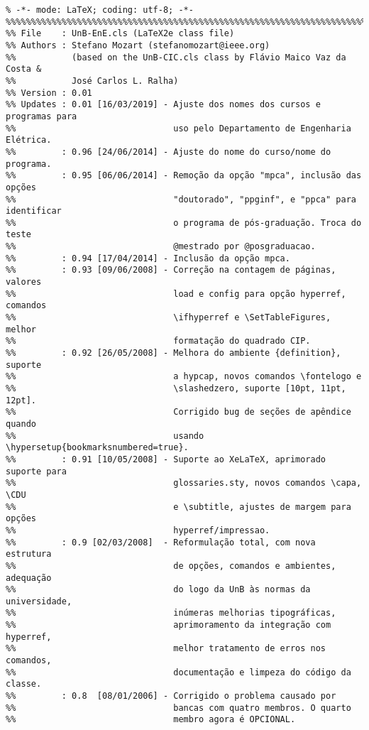 \small\begin{verbatim}
% -*- mode: LaTeX; coding: utf-8; -*-
%%%%%%%%%%%%%%%%%%%%%%%%%%%%%%%%%%%%%%%%%%%%%%%%%%%%%%%%%%%%%%%%%%%%%%%%%%%%%%%
%% File    : UnB-EnE.cls (LaTeX2e class file)
%% Authors : Stefano Mozart (stefanomozart@ieee.org)
%%           (based on the UnB-CIC.cls class by Flávio Maico Vaz da Costa &
%%           José Carlos L. Ralha)
%% Version : 0.01
%% Updates : 0.01 [16/03/2019] - Ajuste dos nomes dos cursos e programas para 
%%                               uso pelo Departamento de Engenharia Elétrica.
%%         : 0.96 [24/06/2014] - Ajuste do nome do curso/nome do programa.
%%         : 0.95 [06/06/2014] - Remoção da opção "mpca", inclusão das opções
%%                               "doutorado", "ppginf", e "ppca" para identificar
%%                               o programa de pós-graduação. Troca do teste 
%%                               @mestrado por @posgraduacao.
%%         : 0.94 [17/04/2014] - Inclusão da opção mpca. 
%%         : 0.93 [09/06/2008] - Correção na contagem de páginas, valores
%%                               load e config para opção hyperref, comandos
%%                               \ifhyperref e \SetTableFigures, melhor
%%                               formatação do quadrado CIP. 
%%         : 0.92 [26/05/2008] - Melhora do ambiente {definition}, suporte
%%                               a hypcap, novos comandos \fontelogo e
%%                               \slashedzero, suporte [10pt, 11pt, 12pt].
%%                               Corrigido bug de seções de apêndice quando
%%                               usando \hypersetup{bookmarksnumbered=true}.
%%         : 0.91 [10/05/2008] - Suporte ao XeLaTeX, aprimorado suporte para
%%                               glossaries.sty, novos comandos \capa, \CDU
%%                               e \subtitle, ajustes de margem para opções
%%                               hyperref/impressao.
%%         : 0.9 [02/03/2008]  - Reformulação total, com nova estrutura
%%                               de opções, comandos e ambientes, adequação
%%                               do logo da UnB às normas da universidade,
%%                               inúmeras melhorias tipográficas,
%%                               aprimoramento da integração com hyperref,
%%                               melhor tratamento de erros nos comandos,
%%                               documentação e limpeza do código da classe.
%%         : 0.8  [08/01/2006] - Corrigido o problema causado por
%%                               bancas com quatro membros. O quarto
%%                               membro agora é OPCIONAL.

\end{verbatim}
